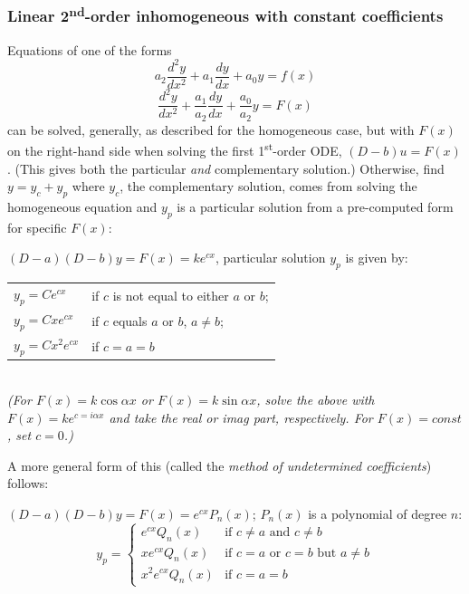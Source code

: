 \documentclass[letterpaper,landscape,10pt]{article}
\begin{document}
{\begin{multicols}{4}
		\subsubsection*{Linear 2\textsuperscript{nd}-order inhomogeneous
				with constant coefficients}
			Equations of one of the forms\\
			$$
				a_2 \frac{d^2y}{dx^2} + a_1 \frac{dy}{dx} + a_0y = f(x)
			$$
			$$
				\frac{d^2y}{dx^2} + \frac{a_1}{a_2} \frac{dy}{dx} +
					\frac{a_0}{a_2}y = F(x)
			$$
			can be solved, generally, as described for the homogeneous case,
			but with $F(x)$ on the right-hand side when solving the first
			1\textsuperscript{st}-order ODE, $(D-b)u=F(x)$.  (This gives both
			the particular \emph{and} complementary solution.)  Otherwise, find
			$y = y_c + y_p$ where $y_c$, the complementary solution, comes from
			solving the homogeneous equation and $y_p$ is a particular solution
			from a pre-computed form for specific $F(x)$:\\
			\begin{center}
			$(D-a)(D-b)y=F(x)=ke^{cx}$, particular solution $y_p$ is given by:\\
			\begin{tabular}{ l l }
				$y_p=Ce^{cx}$ & if $c$ is not equal to either $a$ or $b$; \\
				$y_p=Cxe^{cx}$ & if $c$ equals $a$ or $b$, $a\neq b$;\\
				$y_p=Cx^2e^{cx}$ & if $c=a=b$ \\
			\end{tabular}\\
			\emph{(For $F(x)=k\cos\alpha x$ or $F(x)=k\sin\alpha x$, solve the
			above with $F(x)=ke^{c=i\alpha x}$ and take the real or imag part,
			respectively. For $F(x)=const$, set $c=0$.)}
			\end{center}
			A more general form of this (called the \emph{method of
			undetermined coefficients}) follows:\\
			\begin{center}
				$(D-a)(D-b)y=F(x)=e^{cx}P_n(x)$; $P_n(x)$ is a polynomial of
				degree $n$:
				\[
				y_p = 
				\begin{cases}
					   e^{cx}Q_n(x) & \text{if $c \neq a$ and $c \neq b$}\\
					  xe^{cx}Q_n(x) & \text{if $c=a$ or $c=b$ but $a\neq b$}\\
					x^2e^{cx}Q_n(x) & \text{if $c=a=b$}
				\end{cases}
				\]
			\end{center}


\end{multicols}}
\end{document}
